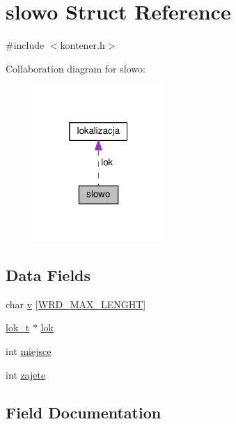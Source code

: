 \hypertarget{structslowo}{}\section{slowo Struct Reference}
\label{structslowo}


{\ttfamily \#include $<$kontener.\+h$>$}



Collaboration diagram for slowo\+:\nopagebreak
\begin{figure}[H]
\begin{center}
\leavevmode
\includegraphics[width=140pt]{structslowo__coll__graph}
\end{center}
\end{figure}
\subsection*{Data Fields}
\begin{DoxyCompactItemize}
\item 
char \hyperlink{structslowo_a155485348d375daf1428b1a631808e46}{v} \mbox{[}\hyperlink{kontener_8h_aaef6c04c23aa5ab59c7530d87e355c4e}{W\+R\+D\+\_\+\+M\+A\+X\+\_\+\+L\+E\+N\+G\+H\+T}\mbox{]}
\item 
\hyperlink{kontener_8h_a973470f0d2bd5351f2f79b119fc095e8}{lok\+\_\+t} $\ast$ \hyperlink{structslowo_a8310a3996804f2f7ab2a1124b0a14617}{lok}
\item 
int \hyperlink{structslowo_ab6457a7c7e89a1b03ddd1f4282fa1a00}{miejsce}
\item 
int \hyperlink{structslowo_a7049547b2831ec4ce08c4b9419621fe8}{zajete}
\end{DoxyCompactItemize}


\subsection{Field Documentation}
\hypertarget{structslowo_a8310a3996804f2f7ab2a1124b0a14617}{}
